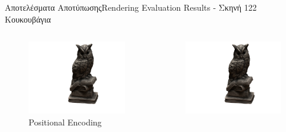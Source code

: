 \documentclass[10pt]{beamer}
\begin{document}
\begin{frame}{Αποτελέσματα Αποτύπωσης}{Rendering Evaluation Results - Σκηνή 122 Κουκουβάγια}
    \begin{columns}[T]
            \begin{figure}
                \includegraphics[height=.3\textheight, width=\linewidth, keepaspectratio]{images/chapter5_img/RenderingResults/PositionalEncoding/eval_055.jpg}
                \caption{\tiny{Positional Encoding}}
            \end{figure}
            \begin{figure}
                \includegraphics[height=.3\textheight, width=\linewidth, keepaspectratio]{images/chapter5_img/RenderingResults/FourierNTK/eval_055.jpg}

\end{figure}
\end{columns}
\end{frame}
\end{document}
